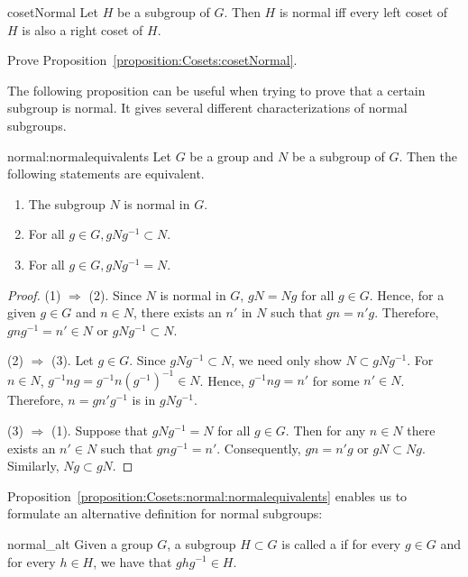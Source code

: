 \begin{prop}{cosetNormal} Let $H$ be a subgroup of $G$. Then $H$ is normal iff every left coset of $H$ is also a right coset of $H$.
\end{prop}
\begin{exercise}{}
Prove Proposition~\ref{proposition:Cosets:cosetNormal}.
\end{exercise}

The following proposition can be useful when trying to prove that a certain subgroup is normal.  It gives several different characterizations of normal subgroups.
  
\begin{prop}{normal:normalequivalents}
Let $G$ be a group and $N$ be a subgroup of $G$. Then the following
statements are equivalent.
\begin{enumerate}
 
\item
The subgroup $N$ is normal in $G$. 
 
\item
For all $g \in G, gNg^{-1} \subset N$. 
 
\item
For all $g \in G, gNg^{-1} = N$.
 
\end{enumerate}
\end{prop}
 
 
\begin{proof}
(1) $\Rightarrow$ (2).
Since $N$ is normal in $G$, $gN = Ng$ for all $g \in G$. Hence, for a
given $g \in G$ and $n \in N$, there exists an $n'$ in $N$ such that
$g n = n' g$. Therefore, $gng^{-1} = n' \in N$ or $gNg^{-1} \subset
N$.
 
 
(2)  $\Rightarrow$ (3).  
Let $g \in G$. Since $gNg^{-1} \subset N$, we need only show $N
\subset gNg^{-1}$. For $n \in N$,  $g^{-1}ng=g^{-1}n(g^{-1})^{-1} \in
N$.  Hence, $g^{-1}ng = n'$ for some $n' \in N$. Therefore, $n = g n'
g^{-1}$ is in $g N g^{-1}$.
 
 
(3) $\Rightarrow$ (1).
Suppose that $gNg^{-1} = N$ for all $g \in G$. Then for any $n \in N$
there exists an $n' \in N$ such that $gng^{-1} = n'$.  Consequently,
$gn = n' g$ or $gN \subset Ng$. Similarly, $Ng \subset gN$.
\end{proof}
 
 Proposition~\ref{proposition:Cosets:normal:normalequivalents} enables us to formulate an alternative definition for normal subgroups:  

\begin{defn}{normal_alt}
 Given a group $G$, a subgroup $H \subset G$ is called a 
 if for every $g \in G$ and for every $h \in H$, we have that $ghg^{-1} \in H$.
\end{defn}

